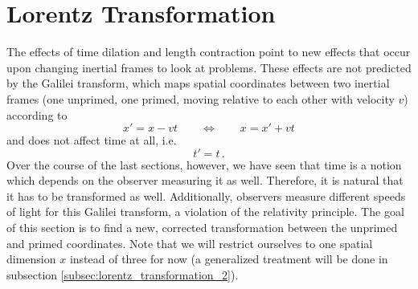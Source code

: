 




\newpage



	\section{Lorentz Transformation}\label{sec:lorentz_transformation_1}
The effects of time dilation and length contraction point to new effects that occur upon changing inertial frames to look at problems. These effects are not predicted by the Galilei transform, which maps spatial coordinates between two inertial frames (one unprimed, one primed, moving relative to each other with velocity $v$) according to 
\begin{equation*}
x' = x - v t
\qquad \Leftrightarrow \qquad
x = x' + v t
\end{equation*}
and does not affect time at all, i.e.
\begin{equation*}
t' = t \, .
\end{equation*}
Over the course of the last sections, however, we have seen that time is a notion which depends on the observer measuring it as well. Therefore, it is natural that it has to be transformed as well. Additionally, observers measure different speeds of light for this Galilei transform, a violation of the relativity principle. The goal of this section is to find a new, corrected transformation between the unprimed and primed coordinates. Note that we will restrict ourselves to one spatial dimension $x$ instead of three for now (a generalized treatment will be done in subsection \ref{subsec:lorentz_transformation_2}).\\



